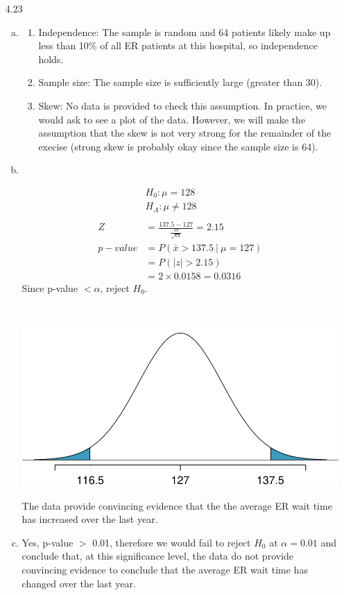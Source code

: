 \documentclass[11pt]{article}
\newenvironment{parts}{
\vspace{-0.25cm}
\begin{enumerate}[(a)]
\setlength{\itemsep}{0mm}
}
{\end{enumerate}
}
\begin{document}
\begin{enumerate}
\item[4.23] 
\begin{parts}
\item \begin{enumerate}[1.]
\item Independence: The sample is random and 64 patients likely make up less than 10\% of all ER patients at this hospital, so independence holds.
\item Sample size: The sample size is sufficiently large (greater than 30).
\item Skew: No data is provided to check this assumption. In practice, we would ask to see a plot of the data. However, we will make the assumption that the skew is not very strong for the remainder of the execise (strong skew is probably okay since the sample size is 64).
\end{enumerate}
\item $\:$ \\
\begin{minipage}[c]{0.45\textwidth}
\begin{align*}
&H_0: \mu = 128 \\
&H_A: \mu \ne 128 \\
\: \\
Z &= \frac{137.5 - 127}{ \frac{39}{\sqrt{64}} } = 2.15 \\
p-value &= P(\bar{x} > 137.5~|~\mu = 127) \\
&= P(|z| > 2.15) \\
&= 2 \times 0.0158 = 0.0316
\end{align*}
Since p-value $< \alpha$, reject $H_0$. \\
\end{minipage}
\begin{minipage}[c]{0.02\textwidth}
$\:$
\end{minipage}
\begin{minipage}[c]{0.5\textwidth}
\begin{center}
\includegraphics[width=\textwidth]{figures/04/ERwait} 
\end{center}
The data provide convincing evidence that the the average ER wait time has increased over the last year.
\end{minipage}
\item Yes, p-value $>$ 0.01, therefore we would fail to reject $H_0$ at $\alpha = 0.01$ and conclude that, at this significance level, the data do not provide convincing evidence to conclude that the average ER wait time has changed over the last year.
\end{parts}


\end{enumerate}
\end{document}
